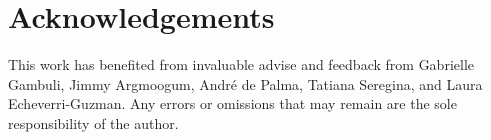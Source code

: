 \documentclass[3p,times,procedia]{elsarticle}
\begin{document}
\section*{Acknowledgements}

This work has benefited from invaluable advise and feedback from Gabrielle Gambuli, Jimmy Argmoogum, André de Palma, Tatiana Seregina, and Laura Echeverri-Guzman.
Any errors or omissions that may remain are the sole responsibility of the author.











\end{document}
